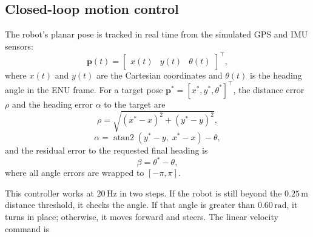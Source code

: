 \documentclass[11pt]{article}
\begin{document}
\subsection{Closed-loop motion control}
The robot's planar pose is tracked in real time from the simulated GPS and IMU
sensors:
\begin{equation}
  \mathbf{p}(t) = \begin{bmatrix} x(t) & y(t) & \theta(t) \end{bmatrix}^{\top},
\end{equation}
where $x(t)$ and $y(t)$ are the Cartesian coordinates and $\theta(t)$ is the
heading angle in the ENU frame. For a target pose
$\mathbf{p}^*=[x^*,y^*,\theta^*]^\top$, the distance error $\rho$ and the
heading error $\alpha$ to the target are
\begin{equation}
  \rho = \sqrt{(x^*-x)^2+(y^*-y)^2},
\end{equation}
\begin{equation}
  \alpha = \operatorname{atan2}(y^*-y,\;x^*-x)-\theta,
\end{equation}
and the residual error to the requested final heading is
\begin{equation}
  \beta = \theta^* - \theta,
\end{equation}
where all angle errors are wrapped to $[-\pi,\pi]$.

This controller works at \(20\,\mathrm{Hz}\) in two steps. If the robot is still beyond the \(0.25\,\mathrm{m}\) distance threshold, it checks the angle. If that angle is greater than \(0.60\,\mathrm{rad}\), it turns in place; otherwise, it moves forward and steers. The linear velocity command is
\end{document}
